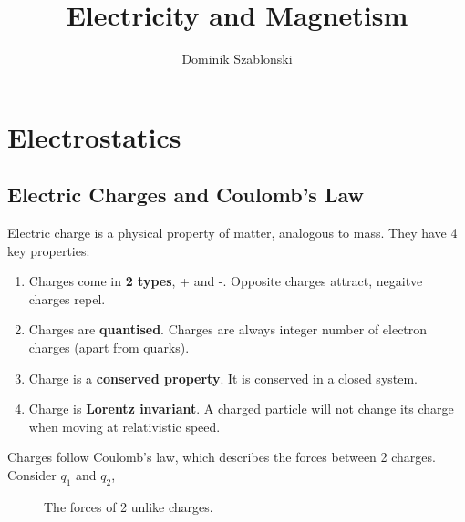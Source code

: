 \documentclass{book}
\title{Electricity and Magnetism}
\author{Dominik Szablonski}
\def\a{2.5}
\def\R{0.33}
\def\F{1.8}
\begin{document}
\maketitle

\tableofcontents

\chapter{Electrostatics}
\section{Electric Charges and Coulomb's Law}
Electric charge is a physical property of matter, analogous to mass. They have 4 key properties:
\begin{enumerate}
    \item Charges come in \textbf{2 types}, + and -. Opposite charges attract, negaitve charges repel. 
    \item Charges are \textbf{quantised}. Charges are always integer number of electron charges (apart from quarks).
    \item Charge is a \textbf{conserved property}. It is conserved in a closed system.
    \item Charge is \textbf{Lorentz invariant}. A charged particle will not change its charge when moving at relativistic speed. 
\end{enumerate}
Charges follow Coulomb's law, which describes the forces between 2 charges. Consider $q_1$ and $q_2$,

\begin{figure}[h]
    \centering

    \caption{The forces of 2 unlike charges.}
    \label{fig:unlikecharges}
\end{figure}
\end{document}
